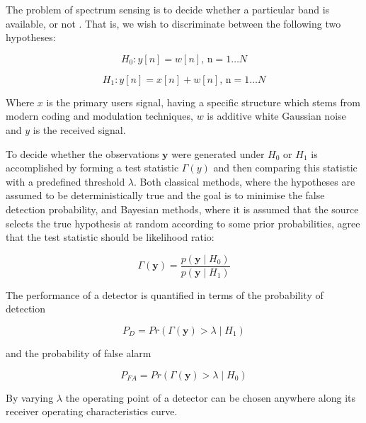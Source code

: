 \documentclass[12pt, a4paper]{article}
\begin{document}
The problem of spectrum sensing is to decide whether a particular band is available, or not \cite{Y}. That is, we wish to discriminate between the following two hypotheses:

\begin{equation}
H_{0}: y\left[n\right] = w\left[n\right] \text{, n} =  1 \ldots N 
\end{equation}
\label{h1}

\begin{equation}
H_{1}: y\left[n \right] = x\left[n\right] + w\left[n\right] \text{, n} =  1 \ldots N 
\end{equation}
\label{h2}

Where \(x\) is the primary users signal, having a specific structure which stems from modern coding and modulation techniques, \(w\) is additive white Gaussian noise and \(y\) is the received signal.

To decide whether the observations \(\textbf{y}\) were generated under \(\textit{H}_{0}\) or \(\textit{H}_{1}\) is accomplished by forming a test statistic \(\Gamma\left(y\right)\) and then comparing this statistic with a predefined threshold \(\lambda\). Both classical methods, where the hypotheses are assumed to be deterministically true and the goal is to minimise the false detection probability, and Bayesian methods, where it is assumed that the source selects the true hypothesis at random according to some prior probabilities, agree that the test statistic should be likelihood ratio:

\begin{equation}
\Gamma\left(\textbf{y}\right) = \frac{p\left(\textbf{y}\mid H_0\right)}{p\left(\textbf{y}\mid H_1\right)}
\end{equation}

The performance of a detector is quantified in terms of the probability of detection

\begin{equation}
P_{D} = Pr\left( \Gamma\left(\textbf{y}\right) > \lambda \mid H_1\right)
\end{equation}

and the probability of false alarm 

\begin{equation}
P_{FA} = Pr\left( \Gamma\left(\textbf{y}\right) > \lambda \mid H_0\right)
\end{equation}

By varying \(\lambda\) the operating point of a detector can be chosen anywhere along its receiver operating characteristics curve.
\end{document}
